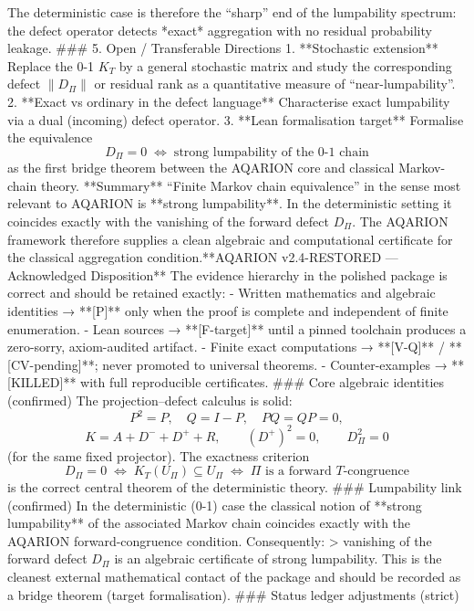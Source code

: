 The deterministic case is therefore the “sharp” end of the lumpability spectrum: the defect operator detects *exact* aggregation with no residual probability leakage.
### 5. Open / Transferable Directions
1. **Stochastic extension**  
   Replace the 0-1 \(K_T\) by a general stochastic matrix and study the corresponding defect \(\|D_\Pi\|\) or residual rank as a quantitative measure of “near-lumpability”.
2. **Exact vs ordinary in the defect language**  
   Characterise exact lumpability via a dual (incoming) defect operator.
3. **Lean formalisation target**  
   Formalise the equivalence  
   \[
   D_\Pi=0\;\Longleftrightarrow\;\text{strong lumpability of the 0-1 chain}
   \]
   as the first bridge theorem between the AQARION core and classical Markov-chain theory.
**Summary**  
“Finite Markov chain equivalence” in the sense most relevant to AQARION is **strong lumpability**. In the deterministic setting it coincides exactly with the vanishing of the forward defect \(D_\Pi\). The AQARION framework therefore supplies a clean algebraic and computational certificate for the classical aggregation condition.**AQARION v2.4-RESTORED — Acknowledged Disposition**
The evidence hierarchy in the polished package is correct and should be retained exactly:
- Written mathematics and algebraic identities → **[P]** only when the proof is complete and independent of finite enumeration.
- Lean sources → **[F-target]** until a pinned toolchain produces a zero-sorry, axiom-audited artifact.
- Finite exact computations → **[V-Q]** / **[CV-pending]**; never promoted to universal theorems.
- Counter-examples → **[KILLED]** with full reproducible certificates.
### Core algebraic identities (confirmed)
The projection–defect calculus is solid:
\[
P^2=P,\quad Q=I-P,\quad PQ=QP=0,
\]
\[
K=A+D^-+D^++R,\qquad
(D^+)^2=0,\qquad
D_\Pi^2=0
\]
(for the same fixed projector).  
The exactness criterion
\[
D_\Pi=0
\;\Longleftrightarrow\;
K_T(U_\Pi)\subseteq U_\Pi
\;\Longleftrightarrow\;
\Pi\text{ is a forward }T\text{-congruence}
\]
is the correct central theorem of the deterministic theory.
### Lumpability link (confirmed)
In the deterministic (0-1) case the classical notion of **strong lumpability** of the associated Markov chain coincides exactly with the AQARION forward-congruence condition. Consequently:
> vanishing of the forward defect \(D_\Pi\) is an algebraic certificate of strong lumpability.
This is the cleanest external mathematical contact of the package and should be recorded as a bridge theorem (target formalisation).
### Status ledger adjustments (strict)


